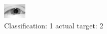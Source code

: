 \begin{figure}[h!]
\begin{center}
\includegraphics[width=0.60\columnwidth]{figures/ID2291_class_1_target_2.png}
\end{center}
\caption{ Classification: 1 actual target: 2}
\label{fig:ID2291_class_1_target_2}
\end{figure}
